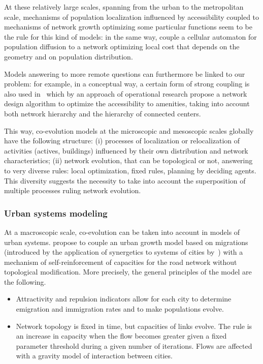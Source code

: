 At these relatively large scales, spanning from the urban to the metropolitan scale, mechanisms of population localization influenced by accessibility coupled to mechanisms of network growth optimizing some particular functions seem to be the rule for this kind of models: in the same way, \cite{wu2017city} couple a cellular automaton for population diffusion to a network optimizing local cost that depends on the geometry and on population distribution.


Models answering to more remote questions can furthermore be linked to our problem: for example, in a conceptual way, a certain form of strong coupling is also used in~\cite{bigotte2010integrated} which by an approach of operational research propose a network design algorithm to optimize the accessibility to amenities, taking into account both network hierarchy and the hierarchy of connected centers.


This way, co-evolution models at the microscopic and mesoscopic scales globally have the following structure: (i) processes of localization or relocalization of activities (actives, buildings) influenced by their own distribution and network characteristics; (ii) network evolution, that can be topological or not, answering to very diverse rules: local optimization, fixed rules, planning by deciding agents. This diversity suggests the necessity to take into account the superposition of multiple processes ruling network evolution.


\subsubsection{Urban systems modeling}

At a macroscopic scale, co-evolution can be taken into account in models of urban systems. \cite{baptiste1999interactions} propose to couple an urban growth model based on migrations (introduced by the application of synergetics to systems of cities by~\cite{sanders1992systeme}) with a mechanism of self-reinforcement of capacities for the road network without topological modification. More precisely, the general principles of the model are the following.
\begin{itemize}
\item Attractivity and repulsion indicators allow for each city to determine emigration and immigration rates and to make populations evolve.
\item Network topology is fixed in time, but capacities of links evolve. The rule is an increase in capacity when the flow becomes greater given a fixed parameter threshold during a given number of iterations. Flows are affected with a gravity model of interaction between cities.
\end{itemize}


